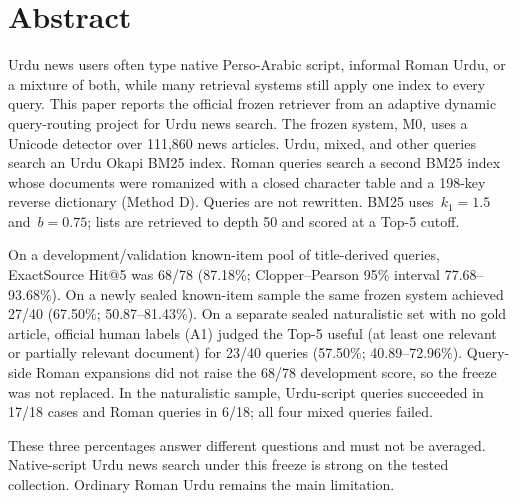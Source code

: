 \documentclass[10pt,letterpaper]{article}
\begin{document}

%
\section*{Abstract}
Urdu news users often type native Perso-Arabic script, informal Roman Urdu, or a mixture of both, while many retrieval systems still apply one index to every query. This paper reports the official frozen retriever from an adaptive dynamic query-routing project for Urdu news search. The frozen system, M0, uses a Unicode detector over 111,860 news articles. Urdu, mixed, and other queries search an Urdu Okapi BM25 index. Roman queries search a second BM25 index whose documents were romanized with a closed character table and a 198-key reverse dictionary (Method D). Queries are not rewritten. BM25 uses~$k_1 = 1.5$ and~$b = 0.75$; lists are retrieved to depth 50 and scored at a Top-5 cutoff.

On a development/validation known-item pool of title-derived queries, ExactSource Hit@5 was 68/78 (87.18\%; Clopper--Pearson 95\% interval 77.68--93.68\%). On a newly sealed known-item sample the same frozen system achieved 27/40 (67.50\%; 50.87--81.43\%). On a separate sealed naturalistic set with no gold article, official human labels (A1) judged the Top-5 useful (at least one relevant or partially relevant document) for 23/40 queries (57.50\%; 40.89--72.96\%). Query-side Roman expansions did not raise the 68/78 development score, so the freeze was not replaced. In the naturalistic sample, Urdu-script queries succeeded in 17/18 cases and Roman queries in 6/18; all four mixed queries failed.

These three percentages answer different questions and must not be averaged. Native-script Urdu news search under this freeze is strong on the tested collection. Ordinary Roman Urdu remains the main limitation.

\end{document}
